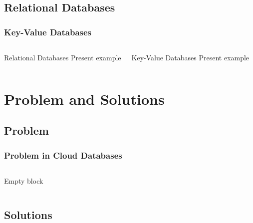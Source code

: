 \documentclass[mathserif,trans]{beamer}
\begin{document}
	
	
	\subsection{Relational Databases}
	
	\begin{frame}
		\frametitle{Key-Value Databases}
		
		\begin{columns}
		
		\begin{block}{Relational Databases}
			Present example
		\end{block}
		
		\begin{block}{Key-Value Databases}
			Present example
		\end{block}
		
		\end{columns}
		
		
	\end{frame}
	
\section{Problem and Solutions}
	\subsection{Problem}
	\begin{frame}
		\frametitle{Problem in Cloud Databases}
		
		
		\begin{columns}
		
		\column{.5\textwidth}		
		\begin{block}{}
			Empty block
		\end{block}
		\column{.5\textwidth}
		\begin{block}{}
		
		\end{block}
		
		\end{columns}
	\end{frame}

\subsection{Solutions}
	
\end{document}
